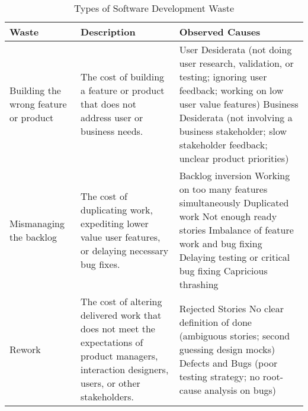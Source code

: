 \begin{table*}[t]
\renewcommand{\arraystretch}{1.3}
\centering
\caption{Types of Software Development Waste}
\label{Waste}
\begin{tabular}{|p{1.7in}|p{1.9in}|p{3in}|}
\hline
Waste  & Description & Observed Causes                                                                                                                                                                                                                                                                                                                                                                                                                     \\ \hline
Building the wrong feature or product &  The cost of building a feature or product that does not address user or business needs. & 
User Desiderata (not doing user research, validation, or testing; ignoring user feedback; working on low user value features) \newline Business Desiderata (not involving a business stakeholder; slow stakeholder feedback; unclear product priorities)                                                                                                                                                                                  \\ \hline
Mismanaging the backlog     & The cost of duplicating work, expediting lower value user features, or delaying necessary bug fixes.  & 
Backlog inversion \newline Working on too many features simultaneously \newline Duplicated work \newline Not enough ready stories  \newline Imbalance of feature work and bug fixing \newline Delaying testing or critical bug fixing \newline Capricious thrashing                                                                                                                                                                                                                                                                                                                                    \\ \hline
Rework                                & The cost of altering delivered work that does not meet the expectations of product managers, interaction designers, users, or other stakeholders. & Rejected Stories \newline No clear definition of done (ambiguous stories; second guessing design mocks) \newline Defects and Bugs (poor testing strategy; no root-cause analysis on bugs)                                                                                                                                                                   \\ \hline

\end{tabular}
\end{table*}
